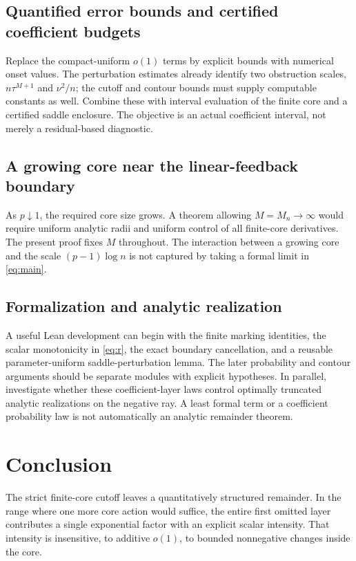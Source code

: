 \documentclass[11pt,a4paper]{article}
\numberwithin{equation}{section}
\theoremstyle{definition}
\theoremstyle{remark}
\begin{document}
\subsection{Quantified error bounds and certified coefficient budgets}
Replace the compact-uniform $o(1)$ terms by explicit bounds with numerical
onset values. The perturbation estimates already identify two obstruction
scales, $n\tau^{M+1}$ and $\nu^2/n$; the cutoff and contour bounds must
supply computable constants as well. Combine these with interval evaluation
of the finite core and a certified saddle enclosure. The objective is an
actual coefficient interval, not merely a residual-based diagnostic.

\subsection{A growing core near the linear-feedback boundary}
As $p\downarrow1$, the required core size grows. A theorem allowing
$M=M_n\to\infty$ would require uniform analytic radii and uniform control of
all finite-core derivatives. The present proof fixes $M$ throughout. The
interaction between a growing core and the scale $(p-1)\log n$ is not
captured by taking a formal limit in \eqref{eq:main}.

\subsection{Formalization and analytic realization}
A useful Lean development can begin with the finite marking identities,
the scalar monotonicity in \eqref{eq:r}, the exact boundary cancellation,
and a reusable parameter-uniform saddle-perturbation lemma. The later
probability and contour arguments should be separate modules with explicit
hypotheses. In parallel, investigate whether these coefficient-layer laws
control optimally truncated analytic realizations on the negative ray.
A least formal term or a coefficient probability law is not automatically
an analytic remainder theorem.

\section{Conclusion}
The strict finite-core cutoff leaves a quantitatively structured remainder.
In the range where one more core action would suffice, the entire first
omitted layer contributes a single exponential factor with an explicit
scalar intensity. That intensity is insensitive, to additive $o(1)$, to
bounded nonnegative changes inside the core.
\end{document}
